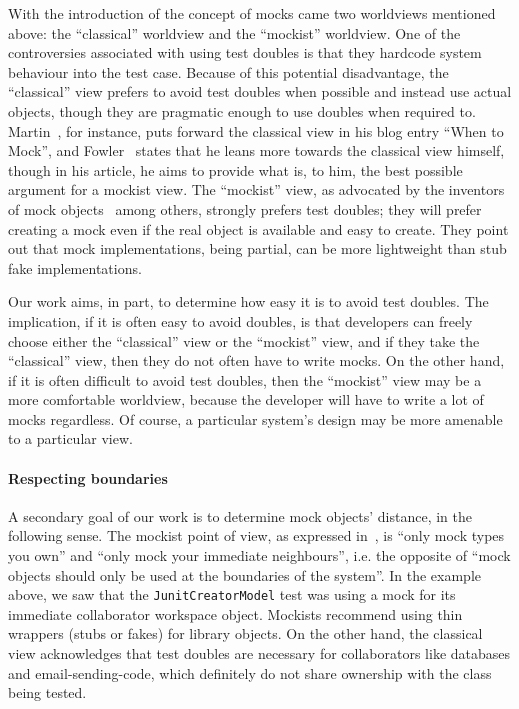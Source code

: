 With the introduction of the concept of mocks came two worldviews mentioned above: the ``classical'' worldview and the ``mockist'' worldview.
One of the controversies associated with using test doubles is that they hardcode system behaviour into the test case. Because of this potential disadvantage, the ``classical'' view prefers to avoid test doubles when possible and instead use actual objects, though they are pragmatic enough to use doubles when required to. Martin~\cite{martin14:_when_mock}, for instance, puts forward the classical view in his blog entry ``When to Mock'', and Fowler~\cite{fowler07:_mocks_arent_stubs} states that he leans more towards the classical view himself, though in his article, he aims to provide what is, to him, the best possible argument for a mockist view. The ``mockist'' view, as advocated by the inventors of mock objects~\cite{freeman04:_mock_roles_objec} among others, strongly prefers test doubles; they will prefer creating a mock even if the real object is available and easy to create. They point out that mock implementations, being partial, can be more lightweight than stub fake implementations.


Our work aims, in part, to determine how easy it is to avoid test doubles. The implication, if it is often easy to avoid doubles, is that developers can freely choose either the ``classical'' view or the ``mockist'' view, and if they take the ``classical'' view, then they do not often have to write mocks. On the other hand, if it is often difficult to avoid test doubles, then the ``mockist'' view may be a more comfortable worldview, because the developer will have to write a lot of mocks regardless. Of course, a particular system's design may be more amenable to a particular view.



\paragraph{Respecting boundaries} A secondary goal of our work is to determine mock objects' distance, in the following sense.
The mockist point of view, as expressed
in~\cite{freeman04:_mock_roles_objec}, is ``only mock types you own'' and ``only mock your immediate
neighbours'', i.e. the opposite of ``mock objects should only be used
at the boundaries of the system''. In the example above, we saw that the
\texttt{JunitCreatorModel} test was using a mock for its immediate collaborator
workspace object. Mockists recommend using thin wrappers (stubs or fakes) for 
library objects. On the other hand, the classical view acknowledges that test doubles
are necessary for collaborators like databases and email-sending-code, which definitely
do not share ownership with the class being tested.

